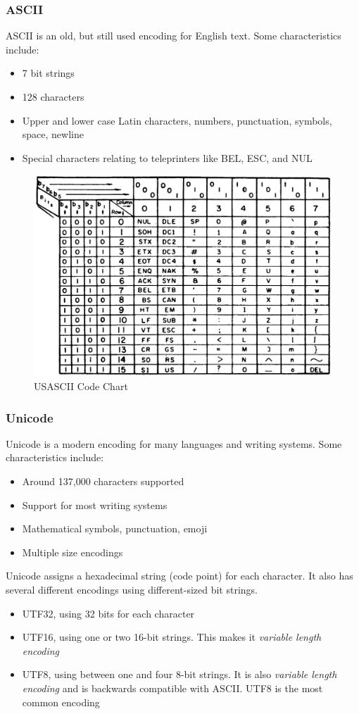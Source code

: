 \documentclass{article}
\begin{document}
\subsubsection{ASCII}
ASCII is an old, but still used encoding for English text.
Some characteristics include:
\begin{itemize}
    \item 7 bit strings
    \item 128 characters
    \item Upper and lower case Latin characters, numbers, punctuation, symbols, space, newline
    \item Special characters relating to teleprinters like BEL, ESC, and NUL
\end{itemize}
\begin{figure}[h]
    \centering
    \includegraphics[width=0.75\linewidth]{images/ascii_chart.png}
    \caption{USASCII Code Chart}
\end{figure}
%
\newpage
\subsubsection{Unicode}
Unicode is a modern encoding for many languages and writing systems.
Some characteristics include:
\begin{itemize}
    \item Around 137,000 characters supported
    \item Support for most writing systems
    \item Mathematical symbols, punctuation, emoji
    \item Multiple size encodings
\end{itemize}
Unicode assigns a hexadecimal string (code point) for each character.
It also has several different encodings using different-sized bit strings.
\begin{itemize}
    \item UTF32, using 32 bits for each character
    \item UTF16, using one or two 16-bit strings. This makes it \emph{variable length encoding}
    \item UTF8, using between one and four 8-bit strings.
          It is also \emph{variable length encoding} and is backwards compatible with ASCII.
          UTF8 is the most common encoding
\end{itemize}
%
\end{document}
